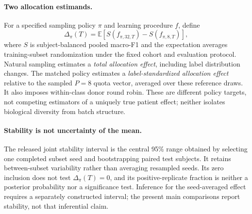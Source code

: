 \paragraph{Two allocation estimands.}
For a specified sampling policy $\pi$ and learning procedure $f$, define
\begin{equation}
\Delta_{\pi}(T)=\mathbb{E}\!\left[S(f_{\pi,32,T})-S(f_{\pi,8,T})\right],
\label{eq:allocation_estimand}
\end{equation}
where $S$ is subject-balanced pooled macro-F1 and the expectation averages
training-subset randomization under the fixed cohort and evaluation protocol.
Natural sampling estimates a \emph{total allocation effect}, including label
distribution changes. The matched policy estimates a \emph{label-standardized
allocation effect} relative to the sampled $P=8$ quota vector, averaged over
these reference draws. It also imposes within-class donor round robin. These
are different policy targets, not competing estimators of a uniquely true
patient effect; neither isolates biological diversity from batch structure.

\paragraph{Stability is not uncertainty of the mean.}
The released joint stability interval is the central 95\% range obtained by
selecting one completed subset seed and bootstrapping paired test subjects.
It retains between-subset variability rather than averaging resampled seeds.
Its zero inclusion does not test $\Delta_{\pi}(T)=0$, and its positive-replicate
fraction is neither a posterior probability nor a significance test. Inference
for the seed-averaged effect requires a separately constructed interval;
the present main comparisons report stability, not that inferential claim.
